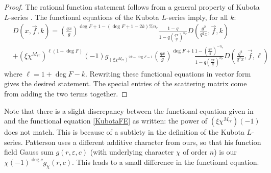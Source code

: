 \documentclass[11pt,letterpaper]{article}
\theoremstyle{definition}
\theoremstyle{remark}
\numberwithin{equation}{section}
\theoremstyle{dotless}
\begin{document}
\begin{proof}
The rational function statement follows from a general property of Kubota $L$-series \cite[bottom of page 245]{Patterson}. The functional equations of the Kubota $L$-series \cite[top of page 251]{Patterson} imply, for all $k$:
\begin{equation}\label{KubotaFE}
\begin{split}
 &D(x, \vec{f}, k) = \left(\frac{qx}{g}\right)^{\deg F + 1 - (\deg F +1-2k)\% n_r} \frac{1-q}{1-q\left(\frac{q x}{g}\right)^{n_r}} D\left(\frac{g^2}{q^2x}, \vec{f}, k\right) \\
&+(\xi \chi^{M_{rr}})^{\ell(1+\deg F)}(-1) g_{(\xi \chi^{M_{rr}})^{2k-\deg F -1}} \left(\frac{qx}{g}\right)^{\deg F + 1}  \frac{1-\left(\frac{qx}{g}\right)^{-n_r}}{1-q\left(\frac{qx}{g}\right)^{n_r}} D\left(\frac{g^2}{q^2x}, \vec{f}, \ell \right)
\end{split}
\end{equation}
where $\ell=1+\deg F -k$. Rewriting these functional equations in vector form gives the desired statement. The special entries of the scattering matrix come from adding the two terms together. 
\end{proof}

Note that there is a slight discrepancy between the functional equation given in \cite{Patterson} and the functional equation \eqref{KubotaFE} as written: the power of $(\xi\chi^{M_{rr}})(-1)$ does not match. This is because of a subtlety in the definition of the Kubota $L$-series. Patterson uses a different additive character from ours, so that his function field Gauss sum $g(r, \varepsilon, c)$ (with underlying character $\chi$ of order $n$) is our $\chi(-1)^{\deg c} g_{\chi}(r, c)$. This leads to a small difference in the functional equation. 
\end{document}
